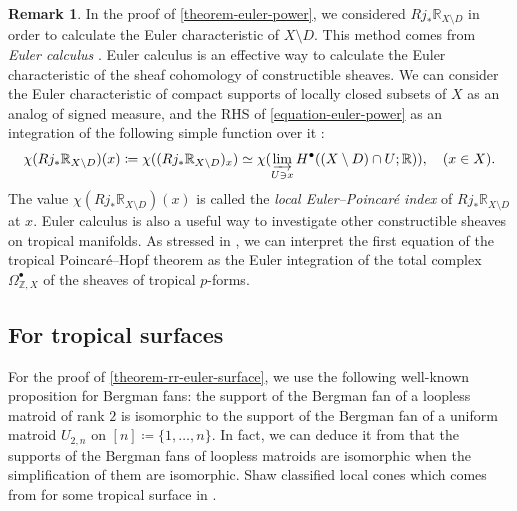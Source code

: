 \documentclass[a4paper,dvipdfmx,reqno,12pt]{amsart}
\theoremstyle{definition}
\newtheorem{remark}[theorem]{Remark}
\newcommand{\deq}{\coloneqq}
\numberwithin{equation}{section}
\begin{document}
\begin{remark}
In the proof of \cref{theorem-euler-power},
we considered $Rj_*\mathbb{R}_{X\setminus D}$
in order to calculate
the Euler characteristic of $X\setminus D$.
This method comes from \emph{Euler calculus}
\cite{MR970076,MR1115569}.
Euler calculus is an effective way to calculate
the Euler characteristic of the sheaf cohomology of
constructible sheaves. We can consider 
the Euler characteristic of compact supports of 
locally closed subsets of $X$
as an analog of signed measure,
and the RHS of \cref{equation-euler-power} as an
integration of the following simple function over it
\cite[(3.4)]{MR1115569}:
\begin{align}
\chi(Rj_*\mathbb{R}_{X\setminus D})(x)\deq 
\chi((Rj_*\mathbb{R}_{X\setminus D})_x) 
\simeq \chi(\varinjlim_{U\ni x} H^{\bullet}((X\setminus D)
\cap U;\mathbb{R})), \quad (x\in X).
\end{align}
The value $\chi(Rj_*\mathbb{R}_{X\setminus D})(x)$ is
called the \emph{local Euler--Poincar\'e index} of 
$Rj_*\mathbb{R}_{X\setminus D}$ at $x$.
Euler calculus is also a useful way to
investigate other constructible sheaves
on tropical manifolds.
As stressed in \cite[Remark 4.8]{MR4540954},
we can interpret the first equation of 
the tropical Poincar\'e--Hopf theorem
\cite[Theorem 4.7]{MR4540954} as 
the Euler integration of the total complex
$\Omega^{\bullet}_{\mathbb{Z},X}$ of the sheaves of
tropical $p$-forms.
\end{remark}

\subsection{For tropical surfaces}

For the proof of \cref{theorem-rr-euler-surface}, we 
use the following well-known 
proposition for Bergman fans: 
the support of the Bergman fan of
a loopless matroid of rank $2$ 
is isomorphic to the support of the Bergman fan of
a uniform matroid $U_{2,n}$ on
$[n]\deq \{1,\ldots,n\}$.
In fact, we can deduce it from that 
the supports of the Bergman fans of
loopless matroids are isomorphic
when the simplification of them are isomorphic.
Shaw classified local cones which comes from
for some tropical surface in
\cite[Corollary 2.4]{shaw2015tropical}.
\end{document}
